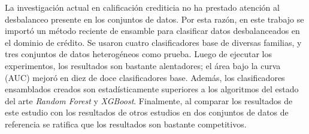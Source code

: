 \begin{resumen}
La investigación actual en calificación crediticia no ha prestado atención al desbalanceo presente en los conjuntos de datos. Por esta razón, en este trabajo se importó un método reciente de ensamble para clasificar datos desbalanceados en el dominio de crédito. Se usaron cuatro clasificadores base de diversas familias, y tres conjuntos de datos heterogéneos como prueba. Luego de ejecutar los experimentos, los resultados son bastante alentadores; el área bajo la curva (AUC) mejoró en diez de doce clasificadores base. Además, los clasificadores ensamblados creados son estadísticamente superiores a los algoritmos del estado del arte \textit{Random Forest} y \textit{XGBoost}. Finalmente, al comparar los resultados de este estudio con los resultados de otros estudios en dos conjuntos de datos de referencia se ratifica que los resultados son bastante competitivos.
\end{resumen}
